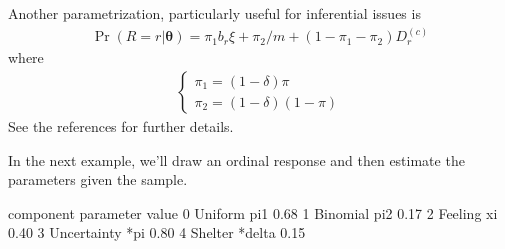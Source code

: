 \documentclass[letterpaper,10pt,english]{sphinxmanual}
\begin{document}
\sphinxAtStartPar
Another parametrization, particularly useful for inferential issues is
\begin{equation*}
\begin{split}\Pr(R=r|\boldsymbol{\theta}) = \pi_1 b_r{\xi} + \pi_2 /m  + (1-\pi_1-\pi_2) D_r^{(c)}\end{split}
\end{equation*}
\sphinxAtStartPar
where
\begin{equation*}
\begin{split}\left\{
\begin{array}{l}
    \pi_1 = (1-\delta)\pi
    \\
    \pi_2 = (1-\delta)(1-\pi)
\end{array}
\right.\end{split}
\end{equation*}
\sphinxAtStartPar
See the references for further details.

\sphinxAtStartPar
In the next example, we’ll draw an ordinal response
and then estimate the parameters given the sample.
\def\sphinxLiteralBlockLabel{\label{\detokenize{manual:id51}}}
\begin{sphinxVerbatim}[commandchars=\\\{\},numbers=left,firstnumber=1,stepnumber=1]
   
    

  
     
      
     

\end{sphinxVerbatim}

\begin{sphinxVerbatim}[commandchars=\\\{\}]
     component parameter  value
0      Uniform       pi1   0.68
1     Binomial       pi2   0.17
2      Feeling        xi   0.40
3  Uncertainty       *pi   0.80
4      Shelter    *delta   0.15
\end{sphinxVerbatim}
\end{document}
